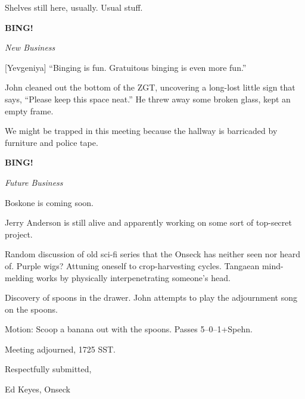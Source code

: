 \documentclass[12pt]{article}
\newcommand{\bing}{{\bf BING!} }
\newcommand{\goto}[1]{\bing \vskip 12pt \centerline{{\em{#1}}}}
\begin{document}
Shelves still here, usually.  Usual stuff.

\goto{New Business}

[Yevgeniya] ``Binging is fun.  Gratuitous binging is even more fun.''

John cleaned out the bottom of the ZGT, uncovering a long-lost little
sign that says, ``Please keep this space neat.''  He threw away some
broken glass, kept an empty frame.

We might be trapped in this meeting because the hallway is barricaded
by furniture and police tape.

\goto{Future Business}

Boskone is coming soon.

Jerry Anderson is still alive and apparently working on some sort of
top-secret project.

Random discussion of old sci-fi series that the Onseck has neither
seen nor heard of.  Purple wigs?  Attuning oneself to crop-harvesting
cycles.  Tangaean mind-melding works by physically interpenetrating
someone's head.

Discovery of spoons in the drawer.  John attempts to play the
adjournment song on the spoons.

Motion: Scoop a banana out with the spoons.  Passes 5--0--1+Spehn.

\vspace{12pt}

\noindent
Meeting adjourned, 1725 SST.

\vspace{18pt}

\centerline{Respectfully submitted,}
\centerline{Ed Keyes, Onseck}
\end{document}
